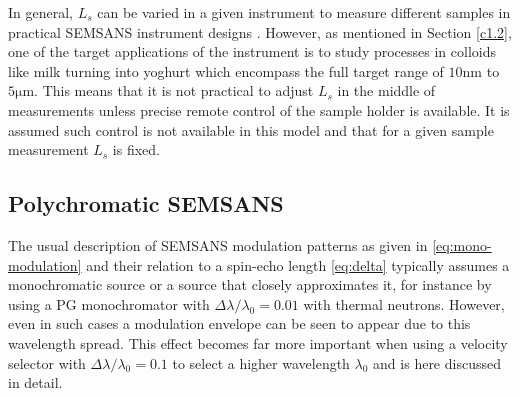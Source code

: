 \documentclass{article}
\begin{document}
In general, $L_s$ can be varied in a given instrument to measure different samples in practical SEMSANS instrument designs \cite{kusmin2017}. However, as mentioned in Section \ref{c1.2}, one of the target applications of the instrument is to study processes in colloids like milk turning into yoghurt which encompass the full target range of $10 \unit{\nano\meter}$ to $5 \unit{\micro\meter}$. This means that it is not practical to adjust $L_s$ in the middle of measurements unless precise remote control of the sample holder is available. It is assumed such control is not available in this model and that for a given sample measurement $L_s$ is fixed. 


\subsection{Polychromatic SEMSANS}
\label{c3.6}
The usual description of SEMSANS modulation patterns as given in \eqref{eq:mono-modulation} and their relation to a spin-echo length \eqref{eq:delta} typically assumes a monochromatic source or a source that closely approximates it, for instance by using a PG monochromator with $\Delta\lambda/\lambda_0 = 0.01$ with thermal neutrons. However, even in such cases a modulation envelope can be seen to appear \cite{bouwman2021} due to this wavelength spread. This effect becomes far more important when using a velocity selector with $\Delta\lambda/\lambda_0 = 0.1$ to select a higher wavelength $\lambda_0$ and is here discussed in detail.
\end{document}
